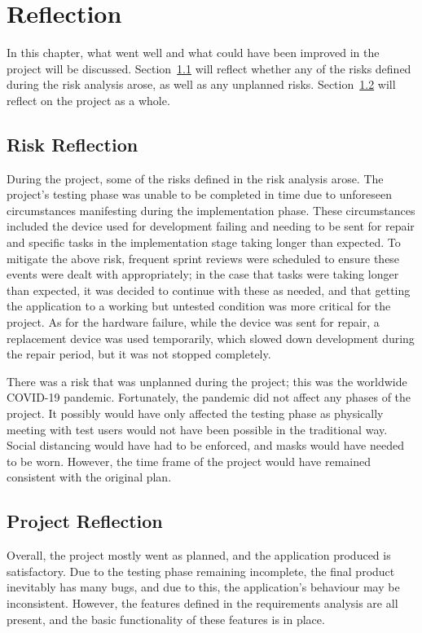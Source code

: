 \chapter{Reflection}
    \label{chap:reflection}
    In this chapter, what went well and what could have been improved in the project will be discussed.  Section~\ref{sec:reflection_risk} will reflect whether any of the risks defined during the risk analysis arose, as well as any unplanned risks.  Section~\ref{sec:reflection_project} will reflect on the project as a whole.
    
    \section{Risk Reflection}
    \label{sec:reflection_risk}
        During the project, some of the risks defined in the risk analysis arose.  The project's testing phase was unable to be completed in time due to unforeseen circumstances manifesting during the implementation phase.  These circumstances included the device used for development failing and needing to be sent for repair and specific tasks in the implementation stage taking longer than expected.  To mitigate the above risk, frequent sprint reviews were scheduled to ensure these events were dealt with appropriately; in the case that tasks were taking longer than expected, it was decided to continue with these as needed, and that getting the application to a working but untested condition was more critical for the project.  As for the hardware failure, while the device was sent for repair, a replacement device was used temporarily, which slowed down development during the repair period, but it was not stopped completely.
        
        There was a risk that was unplanned during the project; this was the worldwide COVID-19 pandemic.  Fortunately, the pandemic did not affect any phases of the project. It possibly would have only affected the testing phase as physically meeting with test users would not have been possible in the traditional way.  Social distancing would have had to be enforced, and masks would have needed to be worn.  However, the time frame of the project would have remained consistent with the original plan.
        
    \section{Project Reflection}
    \label{sec:reflection_project}
        Overall, the project mostly went as planned, and the application produced is satisfactory.  Due to the testing phase remaining incomplete, the final product inevitably has many bugs, and due to this, the application's behaviour may be inconsistent. However, the features defined in the requirements analysis are all present, and the basic functionality of these features is in place.
        
